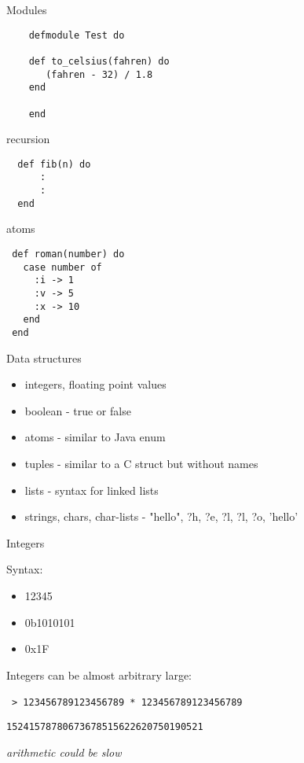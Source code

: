 \begin{frame}[fragile]{Modules}

  \begin{verbatim}
    defmodule Test do

    def to_celsius(fahren) do
       (fahren - 32) / 1.8
    end

    end
  \end{verbatim}

\end{frame}

\begin{frame}[fragile]{recursion}

\begin{verbatim}
  def fib(n) do 
      :
      :
  end
\end{verbatim}

\end{frame}

\begin{frame}[fragile]{atoms}

\begin{verbatim}
 def roman(number) do 
   case number of
     :i -> 1
     :v -> 5
     :x -> 10
   end
 end   
\end{verbatim}
\end{frame}

\begin{frame}{Data structures}

  \begin{itemize}
  \item integers, floating point values \pause
  \item boolean - true or false
  \item atoms - similar to Java enum \pause
  \item tuples - similar to a C struct but without names\pause
  \item lists - syntax for linked lists
  \item strings, chars, char-lists - "hello", ?h, ?e, ?l, ?l, ?o, 'hello'
  \end{itemize}

\end{frame}

\begin{frame}{Integers}

  Syntax:
  \vspace{10pt}
  \begin{itemize}
  \item 12345 \pause
  \item 0b1010101 \pause
  \item 0x1F \pause
  \end{itemize}  

  \vspace{10pt}  
  Integers can be almost arbitrary large: \pause

  \vspace{10pt}\
  {\tt > 123456789123456789 * 123456789123456789}\pause

  {\tt 15241578780673678515622620750190521} \pause
  
  \vspace{20pt}\pause
  {\em arithmetic could be slow}
\end{frame}

